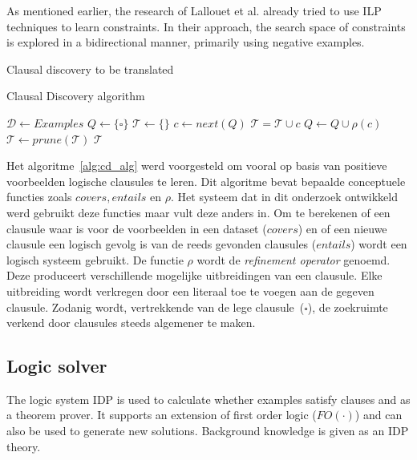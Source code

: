 \documentclass{llncs}
\newcommand{\sym}[1]{\ensuremath{\mathcal{#1}}}
\begin{document}
As mentioned earlier, the research of Lallouet et al.\cite{Lallouet:LearningCP} already tried to use ILP techniques to learn constraints.
In their approach, the search space of constraints is explored in a bidirectional manner, primarily using negative examples.

 {\color{red} Clausal discovery to be translated}
\begin{algorithm}
  \caption{Clausal Discovery algorithm}
  \label{alg:cd_alg}

  \begin{algorithmic}
  \State $\sym{D} \gets Examples$
  \State $Q \gets \{\square\}$
  \State $\sym{T} \gets \{\}$
    \State $c \gets next(Q)$
    \If{$covers(c, \sym{D})$}
      \If{$\lnot entails(\sym{T}, c)$}
        \State $\sym{T} = \sym{T} \cup c$
      \EndIf
    \Else
      \State $Q \gets Q \cup \rho(c)$
    \EndIf
  \EndWhile
  \State $\sym{T} \gets prune(\sym{T})$
  \State \Return \sym{T}
\end{algorithmic}
\end{algorithm}

Het algoritme~\ref{alg:cd_alg} werd voorgesteld om vooral op basis van positieve voorbeelden logische clausules te leren.
Dit algoritme bevat bepaalde conceptuele functies zoals $\mathit{covers}, \mathit{entails}$ en $\rho$.
Het systeem dat in dit onderzoek ontwikkeld werd gebruikt deze functies maar vult deze anders in.
Om te berekenen of een clausule waar is voor de voorbeelden in een dataset ($\mathit{covers}$) en of een nieuwe clausule een logisch gevolg is van de reeds gevonden clausules ($\mathit{entails}$) wordt een logisch systeem gebruikt.
De functie $\rho$ wordt de \textit{refinement operator} genoemd.
Deze produceert verschillende mogelijke uitbreidingen van een clausule.
Elke uitbreiding wordt verkregen door een literaal toe te voegen aan de gegeven clausule.
Zodanig wordt, vertrekkende van de lege clausule~($\square$), de zoekruimte verkend door clausules steeds algemener te maken.

\subsection{Logic solver}
The logic system IDP\cite{de2013prototype,wittocx2008idp} is used to calculate whether examples satisfy clauses and as a theorem prover.
It supports an extension of first order logic ($FO(\cdot)$) and can also be used to generate new solutions.
Background knowledge is given as an IDP theory.
\end{document}
